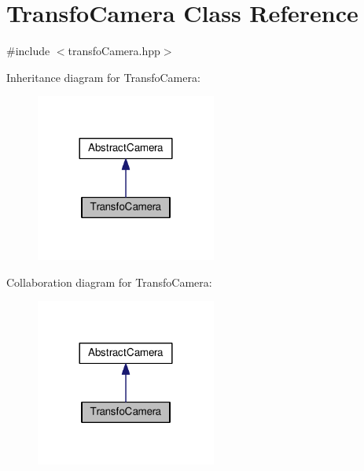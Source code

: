\hypertarget{class_transfo_camera}{\section{Transfo\+Camera Class Reference}
\label{class_transfo_camera}
}


{\ttfamily \#include $<$transfo\+Camera.\+hpp$>$}



Inheritance diagram for Transfo\+Camera\+:
\nopagebreak
\begin{figure}[H]
\begin{center}
\leavevmode
\includegraphics[width=168pt]{class_transfo_camera__inherit__graph}
\end{center}
\end{figure}


Collaboration diagram for Transfo\+Camera\+:
\nopagebreak
\begin{figure}[H]
\begin{center}
\leavevmode
\includegraphics[width=168pt]{class_transfo_camera__coll__graph}
\end{center}
\end{figure}
